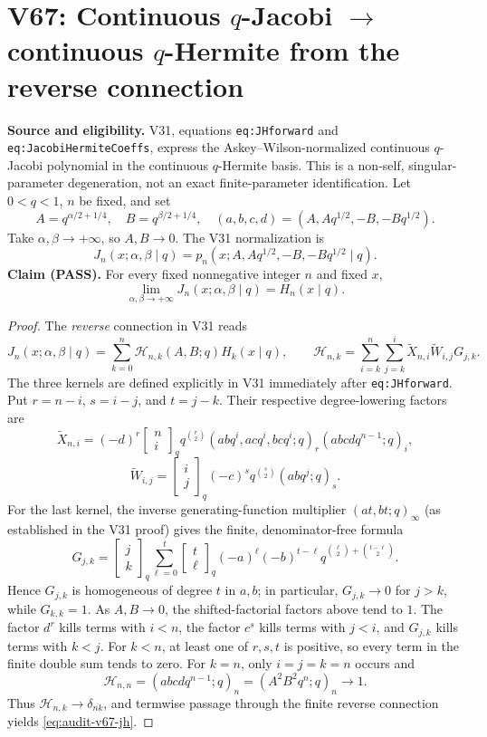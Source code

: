 \documentclass[11pt]{article}
\begin{document}
\section{V67: Continuous $q$-Jacobi $\to$ continuous $q$-Hermite from the reverse connection}
\noindent\textbf{Source and eligibility.} V31, equations \texttt{eq:JHforward} and \texttt{eq:JacobiHermiteCoeffs}, express the Askey--Wilson-normalized continuous $q$-Jacobi polynomial in the continuous $q$-Hermite basis. This is a non-self, singular-parameter degeneration, not an exact finite-parameter identification. Let $0<q<1$, $n$ be fixed, and set
\[
 A=q^{\alpha/2+1/4},\quad B=q^{\beta/2+1/4},\quad
 (a,b,c,d)=(A,Aq^{1/2},-B,-Bq^{1/2}).
\]
Take $\alpha,\beta\to+\infty$, so $A,B\to0$. The V31 normalization is
\[
 J_n(x;\alpha,\beta\mid q)
 =p_n(x;A,Aq^{1/2},-B,-Bq^{1/2}\mid q).
\]
\noindent\textbf{Claim (PASS).} For every fixed nonnegative integer $n$ and fixed $x$,
\begin{equation}\label{eq:audit-v67-jh}
 \boxed{\lim_{\alpha,\beta\to+\infty}J_n(x;\alpha,\beta\mid q)
 =H_n(x\mid q).}
\end{equation}
\begin{proof}
The \emph{reverse} connection in V31 reads
\[
 J_n(x;\alpha,\beta\mid q)
 =\sum_{k=0}^n\mathcal H_{n,k}(A,B;q)H_k(x\mid q),
 \qquad
 \mathcal H_{n,k}=\sum_{i=k}^n\sum_{j=k}^i
 \widetilde X_{n,i}\widetilde W_{i,j}G_{j,k}.
\]
The three kernels are defined explicitly in V31 immediately after
\texttt{eq:JHforward}. Put $r=n-i$, $s=i-j$, and $t=j-k$.
Their respective degree-lowering factors are
\[
 \widetilde X_{n,i}=(-d)^r\begin{bmatrix}n\\i\end{bmatrix}_q
 q^{\binom r2}(abq^i,acq^i,bcq^i;q)_r
 (abcdq^{n-1};q)_i,
\]
\[
 \widetilde W_{i,j}=\begin{bmatrix}i\\j\end{bmatrix}_q
 (-c)^s q^{\binom s2}(abq^j;q)_s.
\]
For the last kernel, the inverse generating-function multiplier
$(at,bt;q)_\infty$ (as established in the V31 proof) gives the
finite, denominator-free formula
\[
 G_{j,k}=\begin{bmatrix}j\\k\end{bmatrix}_q
 \sum_{\ell=0}^{t}\begin{bmatrix}t\\\ell\end{bmatrix}_q
 (-a)^\ell(-b)^{t-\ell}
 q^{\binom\ell2+\binom{t-\ell}2}.
\]
Hence $G_{j,k}$ is homogeneous of degree $t$ in $a,b$; in particular,
$G_{j,k}\to0$ for $j>k$, while $G_{k,k}=1$.
As $A,B\to0$, the shifted-factorial factors above tend to $1$.
The factor $d^r$ kills terms with $i<n$, the factor $c^s$
kills terms with $j<i$, and $G_{j,k}$ kills terms with $k<j$.
For $k<n$, at least one of $r,s,t$ is positive, so every term in
the finite double sum tends to zero. For $k=n$, only $i=j=k=n$
occurs and
\[
 \mathcal H_{n,n}=(abcdq^{n-1};q)_n
 =(A^2B^2q^n;q)_n\longrightarrow1.
\]
Thus $\mathcal H_{n,k}\to\delta_{nk}$, and termwise passage through
the finite reverse connection yields \eqref{eq:audit-v67-jh}.
\end{proof}
\end{document}
